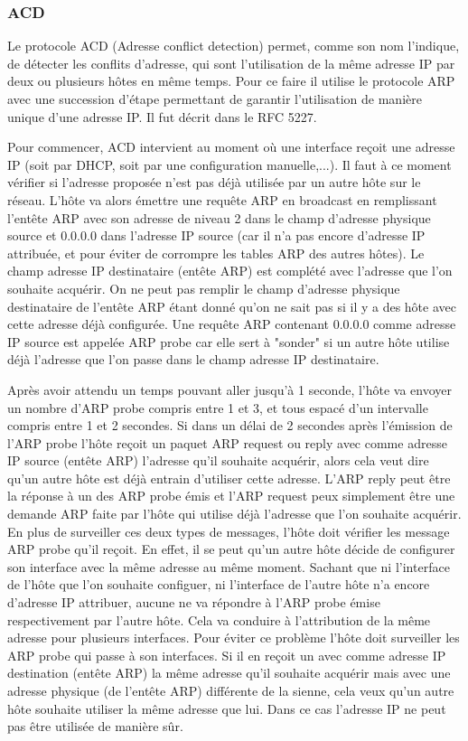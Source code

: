 \subsubsection{ACD} Le protocole ACD (Adresse conflict detection) permet, comme
son nom l'indique, de détecter les conflits d'adresse, qui sont l'utilisation
de la même adresse IP par deux ou plusieurs hôtes en même temps. Pour ce faire
il utilise le protocole ARP avec une succession d'étape permettant de garantir
l'utilisation de manière unique d'une adresse IP. Il fut décrit dans le RFC
5227\cite{url-RFC-ACD}.

Pour commencer, ACD intervient au moment où une interface reçoit une adresse IP
(soit par DHCP, soit par une configuration manuelle,...). Il faut à ce moment
vérifier si l'adresse proposée n'est pas déjà utilisée par un autre hôte sur le
réseau.  L'hôte va alors émettre une requête ARP en broadcast en remplissant
l'entête ARP avec son adresse de niveau 2 dans le champ d'adresse physique
source et 0.0.0.0 dans l'adresse IP source (car il n'a pas encore d'adresse IP
attribuée, et pour éviter de corrompre les tables ARP des autres hôtes). Le
champ adresse IP destinataire (entête ARP) est complété avec l'adresse que l'on
souhaite acquérir. On ne peut pas remplir le champ d'adresse physique
destinataire de l'entête ARP étant donné qu'on ne sait pas si il y a des hôte
avec cette adresse déjà configurée.  Une requête ARP contenant 0.0.0.0 comme
adresse IP source est appelée ARP probe car elle sert à "sonder" si un autre
hôte utilise déjà l'adresse que l'on passe dans le champ adresse IP
destinataire.

Après avoir attendu un temps pouvant aller jusqu'à 1 seconde, l'hôte va envoyer
un nombre d'ARP probe compris entre 1 et 3, et tous espacé d'un intervalle
compris entre 1 et 2 secondes.  Si dans un délai de 2 secondes après l'émission
de l'ARP probe l'hôte reçoit un paquet ARP request ou reply avec comme adresse
IP source (entête ARP) l'adresse qu'il souhaite acquérir, alors cela veut dire
qu'un autre hôte est déjà entrain d'utiliser cette adresse. L'ARP reply peut
être la réponse à un des ARP probe émis et l'ARP request peux simplement être
une demande ARP faite par l'hôte qui utilise déjà l'adresse que l'on souhaite
acquérir. En plus de surveiller ces deux types de messages, l'hôte doit
vérifier les message ARP probe qu'il reçoit. En effet, il se peut qu'un autre
hôte décide de configurer son interface avec la même adresse au même moment.
Sachant que ni l'interface de l'hôte que l'on souhaite configuer, ni
l'interface de l'autre hôte n'a encore d'adresse IP attribuer, aucune ne va
répondre à l'ARP probe émise respectivement par l'autre hôte. Cela va conduire
à l'attribution de la même adresse pour plusieurs interfaces. Pour éviter ce
problème l'hôte doit surveiller les ARP probe qui passe à son interfaces. Si il
en reçoit un avec comme adresse IP destination (entête ARP) la même adresse
qu'il souhaite acquérir mais avec une adresse physique (de l'entête ARP)
différente de la sienne, cela veux qu'un autre hôte souhaite utiliser la même
adresse que lui. Dans ce cas l'adresse IP ne peut pas être utilisée de manière
sûr.

